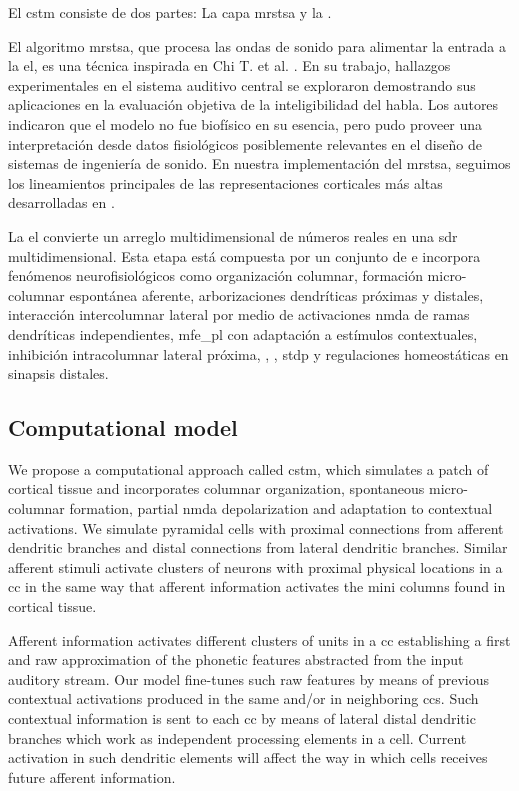 {El \gls{cstm} consiste de dos partes: La capa \gls{mrstsa} y la .

El algoritmo \gls{mrstsa}, que procesa las ondas de sonido para alimentar la entrada a la \gls{el}, es una técnica inspirada en Chi T. et al. \cite{chi_2005}. En su trabajo, hallazgos experimentales en el sistema auditivo central se exploraron demostrando sus aplicaciones en la evaluación objetiva de la inteligibilidad del habla. Los autores indicaron que el modelo no fue biofísico en su esencia, pero pudo proveer una interpretación desde datos fisiológicos posiblemente relevantes en el diseño de sistemas de ingeniería de sonido. En nuestra implementación del \gls{mrstsa}, seguimos los lineamientos principales de las representaciones corticales más altas desarrolladas en \cite{chi_2005}.

La \gls{el} convierte un arreglo multidimensional de números reales en una \gls{sdr} multidimensional. Esta etapa está compuesta por un conjunto de  \cite{kohonen_2082, Kohonen:1989:SAM:69371} e incorpora fenómenos neurofisiológicos como organización columnar, formación micro-columnar espontánea aferente, arborizaciones dendríticas próximas y distales, interacción intercolumnar lateral por medio de activaciones \gls{nmda} de ramas dendríticas independientes, \gls{mfe_pl} con adaptación a estímulos contextuales, inhibición intracolumnar lateral próxima, , , \gls{stdp} y regulaciones homeostáticas en sinapsis distales.
}{
\subsection{Computational model}
\label{model-implementation}

We propose a computational approach called \gls{cstm}, which simulates a patch of cortical tissue and incorporates columnar organization, spontaneous micro-columnar formation, partial \gls{nmda} depolarization and adaptation to contextual activations. We simulate pyramidal cells with proximal connections from afferent dendritic branches and distal connections from lateral dendritic branches. Similar afferent stimuli activate clusters of neurons with proximal physical locations in a \gls{cc} in the same way that afferent information activates the mini columns found in cortical tissue.

Afferent information activates different clusters of units in a \gls{cc} establishing a first and raw approximation of the phonetic features abstracted from the input auditory stream. Our model fine-tunes such raw features by means of previous contextual activations produced in the same and/or in neighboring \glspl{cc}. Such contextual information is sent to each \gls{cc} by means of lateral distal dendritic branches which work as independent processing elements in a cell. Current activation in such dendritic elements will affect the way in which cells receives future afferent information.

}
